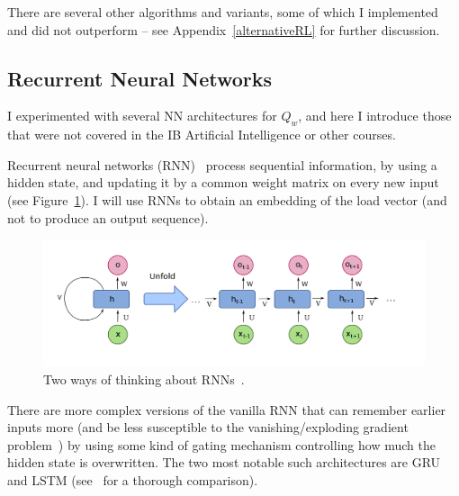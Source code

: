There are several other algorithms and variants, some of which I implemented and did not outperform \DQL -- see Appendix~\ref{alternativeRL} for further discussion.


\subsection{Recurrent Neural Networks} \label{RNN}


I experimented with several NN architectures for $Q_w$, and here I introduce those that were not covered in the IB Artificial Intelligence or other courses.

Recurrent neural networks (RNN)~\cite{hopfield1982RNNoriginal} process sequential information, by using a hidden state, and updating it by a common weight matrix on every new input (see Figure~\ref{RNN-image}). I will use RNNs to obtain an embedding of the load vector (and not to produce an output sequence).

\begin{figure}[h]
    \centering
    \includegraphics[scale=0.2]{Chapter2/Figs/RNN.png}
    \caption{Two ways of thinking about RNNs~\cite{RNN}.}
     \label{RNN-image}
\end{figure}

There are more complex versions of the vanilla RNN that can remember earlier inputs more (and be less susceptible to the vanishing/exploding gradient problem~\cite{noh2021rnnvanishinggradient}) by using some kind of gating mechanism controlling how much the hidden state is overwritten. The two most notable such architectures are GRU and LSTM (see~\cite{shewalkar2019rnngrulstm} for a thorough comparison).


